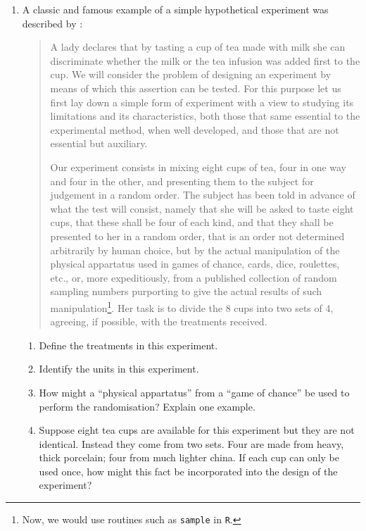 \documentclass[
]{book}
\providecommand{\tightlist}{%
  \setlength{\itemsep}{0pt}\setlength{\parskip}{0pt}}
\theoremstyle{definition}
\theoremstyle{definition}
\theoremstyle{definition}
\theoremstyle{definition}
\theoremstyle{remark}
\begin{document}
\begin{enumerate}
\def\labelenumi{\arabic{enumi}.}
\item
  \citep[Adapted from][]{Morris2011} A classic and famous example of a simple hypothetical experiment was described by \citet{Fisher1935}:

  \begin{quote}
  A lady declares that by tasting a cup of tea made with milk she can discriminate whether the milk or the tea infusion was added first to the cup. We will consider the problem of designing an experiment by means of which this assertion can be tested. For this purpose let us first lay down a simple form of experiment with a view to studying its limitations and its characteristics, both those that same essential to the experimental method, when well developed, and those that are not essential but auxiliary.

  Our experiment consists in mixing eight cups of tea, four in one way and four in the other, and presenting them to the subject for judgement in a random order. The subject has been told in advance of what the test will consist, namely that she will be asked to taste eight cups, that these shall be four of each kind, and that they shall be presented to her in a random order, that is an order not determined arbitrarily by human choice, but by the actual manipulation of the physical appartatus used in games of chance, cards, dice, roulettes, etc., or, more expeditiously, from a published collection of random sampling numbers purporting to give the actual results of such manipulation\footnote{Now, we would use routines such as \texttt{sample} in \texttt{R}.}. Her task is to divide the 8 cups into two sets of 4, agreeing, if possible, with the treatments received.
  \end{quote}

  \begin{enumerate}
  \def\labelenumii{\alph{enumii}.}
  \tightlist
  \item
    Define the treatments in this experiment.
  \item
    Identify the units in this experiment.
  \item
    How might a ``physical appartatus'' from a ``game of chance'' be used to perform the randomisation? Explain one example.
  \item
    Suppose eight tea cups are available for this experiment but they are not identical. Instead they come from two sets. Four are made from heavy, thick porcelain; four from much lighter china. If each cup can only be used once, how might this fact be incorporated into the design of the experiment?
  \end{enumerate}
\end{enumerate}
\end{document}
